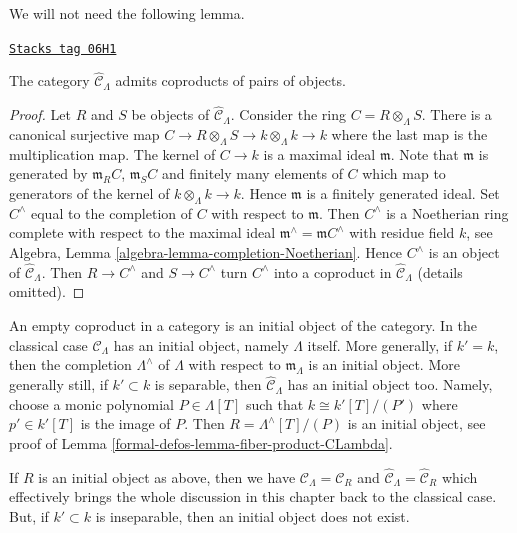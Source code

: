 We will not need the following lemma.

\begin{lemma}
\label{formal-defos-lemma-CLambdahat-coproducts}
\href{https://stacks.math.columbia.edu/tag/06H1}{\texttt{Stacks tag 06H1}}

The category $\widehat{\mathcal{C}}_\Lambda$ admits coproducts
of pairs of objects.
\end{lemma}

\begin{proof}
Let $R$ and $S$ be objects of $\widehat{\mathcal{C}}_\Lambda$.
Consider the ring $C = R \otimes_\Lambda S$. There is a canonical
surjective map $C \to R \otimes_\Lambda S \to k \otimes_\Lambda k \to k$
where the last map is the multiplication map. The kernel of
$C \to k$ is a maximal ideal $\mathfrak m$. Note that $\mathfrak m$
is generated by $\mathfrak m_R C$, $\mathfrak m_S C$ and finitely many
elements of $C$ which map to generators of the kernel of
$k \otimes_\Lambda k \to k$. Hence $\mathfrak m$ is a finitely
generated ideal. Set
$C^\wedge$ equal to the completion of $C$ with respect to $\mathfrak m$.
Then $C^\wedge$ is a Noetherian ring complete with respect to
the maximal ideal $\mathfrak m^\wedge = \mathfrak mC^\wedge$
with residue field $k$, see
Algebra, Lemma \ref{algebra-lemma-completion-Noetherian}.
Hence $C^\wedge$ is an object of $\widehat{\mathcal{C}}_\Lambda$.
Then $R \to C^\wedge$ and $S \to C^\wedge$ turn $C^\wedge$
into a coproduct in $\widehat{\mathcal{C}}_\Lambda$ (details omitted).
\end{proof}

An empty coproduct in a category is an initial object of the category.
In the classical case $\widehat{\mathcal{C}}_\Lambda$ has an initial
object, namely $\Lambda$ itself. More generally, if $k' = k$, then
the completion $\Lambda^\wedge$ of $\Lambda$ with respect to
$\mathfrak m_\Lambda$ is an initial object. More generally still, if
$k' \subset k$ is separable, then $\widehat{\mathcal{C}}_\Lambda$ has an
initial object too. Namely, choose a monic polynomial $P \in \Lambda[T]$
such that $k \cong k'[T]/(P')$ where $p' \in k'[T]$ is the image
of $P$. Then $R = \Lambda^\wedge[T]/(P)$ is an initial object, see proof of
Lemma \ref{formal-defos-lemma-fiber-product-CLambda}.

\medskip\noindent
If $R$ is an initial object as above, then we have
$\mathcal{C}_\Lambda = \mathcal{C}_R$ and
$\widehat{\mathcal{C}}_\Lambda = \widehat{\mathcal{C}}_R$ which effectively
brings the whole discussion in this chapter back to the classical case.
But, if $k' \subset k$ is inseparable, then an initial object does not
exist.

